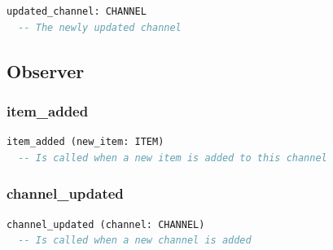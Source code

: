 \begin{lstlisting}[language=Eiffel]
updated_channel: CHANNEL
  -- The newly updated channel
\end{lstlisting}


\subsection{Observer}
\label{sec:feed-simple-channel-observer-observer}

\subsubsection{item\_added}

\begin{lstlisting}[language=Eiffel]
item_added (new_item: ITEM)
  -- Is called when a new item is added to this channel
\end{lstlisting}

\subsubsection{channel\_updated}

\begin{lstlisting}[language=Eiffel]
channel_updated (channel: CHANNEL)
  -- Is called when a new channel is added
\end{lstlisting}